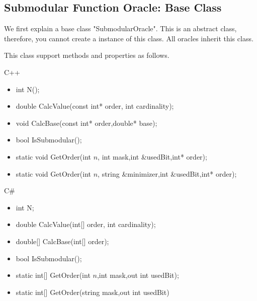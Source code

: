 \documentclass{article}
\begin{document}
\subsection{Submodular Function Oracle: Base Class}\label{oracleBase}
We first explain a base class "SubmodularOracle".
This is an abstract class, therefore,
you cannot create a instance of this class.
All oracles inherit this class.

This class support methods and properties as follows.

\mbox{}

{\sf C++}
\begin{itemize}
\item int N();
\item double CalcValue(const int* order, int cardinality);
\item void CalcBase(const int* order,double* base);
\item bool IsSubmodular();
\item static void GetOrder(int $n$, int mask,int \&usedBit,int* order);
\item static void GetOrder(int $n$, string \&minimizer,int \&usedBit,int* order);
\end{itemize}

\mbox{}

{\sf C\#}
\begin{itemize}
\item int N;
\item double CalcValue(int[] order, int cardinality);
\item double[] CalcBase(int[] order);
\item bool IsSubmodular();
\item static int[] GetOrder(int $n$,int mask,out int usedBit);
\item static int[] GetOrder(string mask,out int usedBit)
\end{itemize}


\mbox{}
\end{document}
